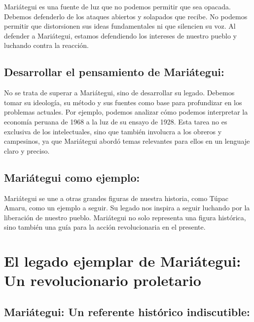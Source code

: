 \documentclass[
  a4paper,
]{article}
\begin{document}
Mariátegui es una fuente de luz que no podemos permitir que sea opacada.
Debemos defenderlo de los ataques abiertos y solapados que recibe. No
podemos permitir que distorsionen sus ideas fundamentales ni que
silencien su voz. Al defender a Mariátegui, estamos defendiendo los
intereses de nuestro pueblo y luchando contra la reacción.

\hypertarget{desarrollar-el-pensamiento-de-mariuxe1tegui}{%
\subsection{Desarrollar el pensamiento de
Mariátegui:}\label{desarrollar-el-pensamiento-de-mariuxe1tegui}}

No se trata de superar a Mariátegui, sino de desarrollar su legado.
Debemos tomar su ideología, su método y sus fuentes como base para
profundizar en los problemas actuales. Por ejemplo, podemos analizar
cómo podemos interpretar la economía peruana de 1968 a la luz de su
ensayo de 1928. Esta tarea no es exclusiva de los intelectuales, sino
que también involucra a los obreros y campesinos, ya que Mariátegui
abordó temas relevantes para ellos en un lenguaje claro y preciso.

\hypertarget{mariuxe1tegui-como-ejemplo}{%
\subsection{Mariátegui como ejemplo:}\label{mariuxe1tegui-como-ejemplo}}

Mariátegui se une a otras grandes figuras de nuestra historia, como
Túpac Amaru, como un ejemplo a seguir. Su legado nos inspira a seguir
luchando por la liberación de nuestro pueblo. Mariátegui no solo
representa una figura histórica, sino también una guía para la acción
revolucionaria en el presente.

\hypertarget{el-legado-ejemplar-de-mariuxe1tegui-un-revolucionario-proletario}{%
\section{El legado ejemplar de Mariátegui: Un revolucionario
proletario}\label{el-legado-ejemplar-de-mariuxe1tegui-un-revolucionario-proletario}}

\hypertarget{mariuxe1tegui-un-referente-histuxf3rico-indiscutible}{%
\subsection{Mariátegui: Un referente histórico
indiscutible:}\label{mariuxe1tegui-un-referente-histuxf3rico-indiscutible}}
\end{document}
